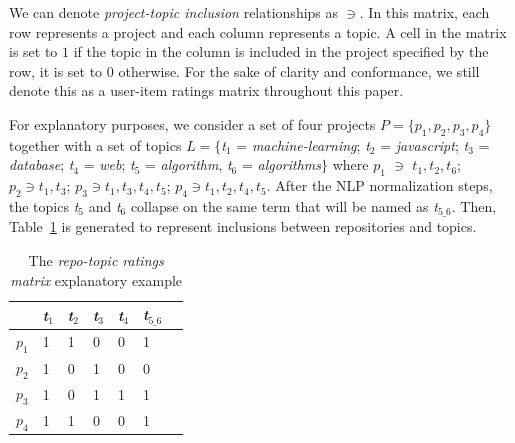 We can denote \emph{project-topic inclusion} relationships as $\ni$. In this matrix, each row represents a project and each column represents a topic. A cell in the matrix is set to $1$ if the topic in the column is included in the project specified by the row, it is set to $0$
otherwise. For the sake of clarity and conformance, we still denote this as a user-item ratings matrix throughout this
paper.

For explanatory purposes, we consider a set of four projects $P=\{p_1,p_2,p_3,p_4 \}$ together with a set of topics $L=\{$\emph{t$_1$} = \emph{machine-learning}; \emph{t$_2$} = \emph{javascript}; \emph{t$_3$} = \emph{database}; \emph{t$_4$} = \emph{web}; \emph{t$_5$} = \emph{algorithm}, \emph{t$_6$} = \emph{algorithms}$\}$ where $p_1$ $\ni$ $t_1,t_2, t_6$; $p_2 \ni t_1,t_3$; $p_3 \ni t_1 ,t_3, t_4, t_5$; $p_4 \ni t_1,t_2,t_4,t_5$. After the NLP normalization steps, the topics \emph{t$_5$} and \emph{t$_6$} collapse on the same term that will be named as \emph{t$_{5\_6}$}. Then, Table~\ref{tab:repo-topic-matrix} is generated to represent inclusions between repositories and topics.
\begin{table}[t]
	\begin{tabular}{|l|l|l|l|l|l|l|}
		\hline
		& \emph{t$_1$} & \emph{t$_2$} & \emph{t$_3$} & \emph{t$_4$} & \emph{t$_{5\_6}$} \\
		\hline
		$p_1$ & 1 & 1 & 0 & 0 & 1 \\ \hline
		$p_2$ & 1 & 0 & 1 & 0 & 0 \\ \hline
		$p_3$ & 1 & 0 & 1 & 1 & 1 \\ \hline
		$p_4$ & 1 & 1 & 0 & 0 & 1 \\ \hline
	\end{tabular}
    \caption{The \emph{repo-topic ratings matrix} explanatory example}
    \label{tab:repo-topic-matrix}
\end{table}

